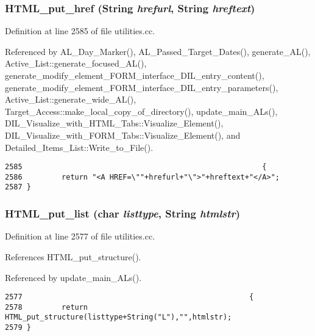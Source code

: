 \subsubsection{ HTML\_\-put\_\-href ({\bf String} {\em hrefurl}, {\bf String} {\em hreftext})}\label{dil2al_8hh_a267}




Definition at line 2585 of file utilities.cc.

Referenced by AL\_\-Day\_\-Marker(), AL\_\-Passed\_\-Target\_\-Dates(), generate\_\-AL(), Active\_\-List::generate\_\-focused\_\-AL(), generate\_\-modify\_\-element\_\-FORM\_\-interface\_\-DIL\_\-entry\_\-content(), generate\_\-modify\_\-element\_\-FORM\_\-interface\_\-DIL\_\-entry\_\-parameters(), Active\_\-List::generate\_\-wide\_\-AL(), Target\_\-Access::make\_\-local\_\-copy\_\-of\_\-directory(), update\_\-main\_\-ALs(), DIL\_\-Visualize\_\-with\_\-HTML\_\-Tabs::Visualize\_\-Element(), DIL\_\-Visualize\_\-with\_\-FORM\_\-Tabs::Visualize\_\-Element(), and Detailed\_\-Items\_\-List::Write\_\-to\_\-File().



\footnotesize\begin{verbatim}2585                                                       {
2586         return "<A HREF=\""+hrefurl+"\">"+hreftext+"</A>";
2587 }
\end{verbatim}\normalsize 
{}
\subsubsection{ HTML\_\-put\_\-list (char {\em listtype}, {\bf String} {\em htmlstr})}\label{dil2al_8hh_a265}




Definition at line 2577 of file utilities.cc.

References HTML\_\-put\_\-structure().

Referenced by update\_\-main\_\-ALs().



\footnotesize\begin{verbatim}2577                                                    {
2578         return HTML_put_structure(listtype+String("L"),"",htmlstr);
2579 }
\end{verbatim}\normalsize 
{}
